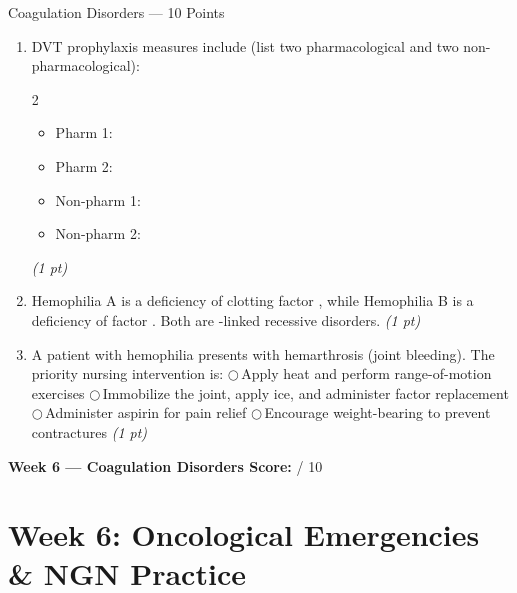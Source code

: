 \documentclass[11pt,letterpaper]{article}
\newcommand{\blank}[1][3cm]{\underline{\hspace{#1}}}
\begin{document}
\begin{diagbox}{Coagulation Disorders --- 10 Points}
\begin{enumerate}[leftmargin=1.5em, label=\textbf{\arabic*.}]
  \item DVT prophylaxis measures include (list two pharmacological and two non-pharmacological):
        \begin{multicols}{2}
        \begin{itemize}[leftmargin=1em]
          \item Pharm 1: \blank[3cm]
          \item Pharm 2: \blank[3cm]
          \item Non-pharm 1: \blank[3cm]
          \item Non-pharm 2: \blank[3cm]
        \end{itemize}
        \end{multicols}
        \hfill\textit{(1 pt)}

  \item Hemophilia A is a deficiency of clotting factor \blank[2cm], while
        Hemophilia B is a deficiency of factor \blank[2cm].  Both are
        \blank[3cm]-linked recessive disorders.
        \hfill\textit{(1 pt)}

  \item A patient with hemophilia presents with hemarthrosis (joint bleeding).
        The priority nursing intervention is:
        $\bigcirc$\,Apply heat and perform range-of-motion exercises
        $\bigcirc$\,Immobilize the joint, apply ice, and administer factor replacement
        $\bigcirc$\,Administer aspirin for pain relief
        $\bigcirc$\,Encourage weight-bearing to prevent contractures
        \hfill\textit{(1 pt)}

\end{enumerate}

\vspace{0.3cm}
\textbf{Week 6 --- Coagulation Disorders Score:} \blank[1cm] / 10
\end{diagbox}

\newpage

\section{Week 6: Oncological Emergencies \& NGN Practice}
\end{document}
